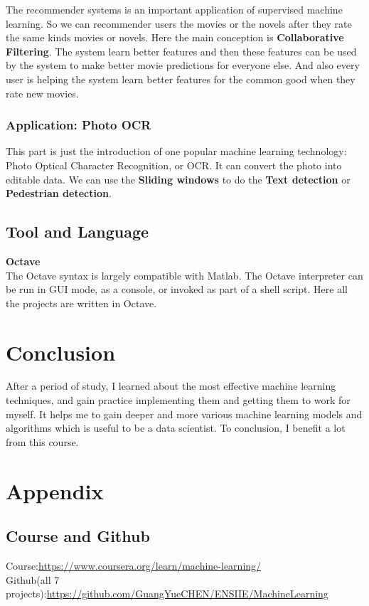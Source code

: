 \documentclass[a4paper]{article}
\begin{document}
{The recommender systems is an important application of supervised machine learning. So we can recommender users the movies or the novels after they rate the same kinds movies or novels. Here the main conception is \textbf{Collaborative Filtering}. The system learn better features and then these features can be used by the system to make better movie predictions for everyone else. And also every user is helping the system learn better features for the common good when they rate new movies. 
\subsubsection{\textbf{Application: Photo OCR}}
This part is just the introduction of one popular machine learning technology: Photo Optical Character Recognition, or OCR.  It can convert the photo into editable data. We can use the \textbf{Sliding windows} to do the \textbf{Text detection} or \textbf{Pedestrian  detection}.

\subsection{Tool and Language}
\textbf{Octave}\\
The Octave syntax is largely compatible with Matlab. The Octave interpreter can be run in GUI mode, as a console, or invoked as part of a shell script. Here all the projects are written in Octave.

\newpage
\section{Conclusion}
After a period of study, I learned about the most effective machine learning techniques, and gain practice implementing them and getting them to work for myself. It helps me to gain deeper and more various machine learning models and algorithms which is useful to be a data scientist. To conclusion, I benefit a lot from this course.
}
\section{Appendix}
\subsection{Course and Github}

Course:\href{https://www.coursera.org/learn/machine-learning/}{https://www.coursera.org/learn/machine-learning/} \\
Github(all 7 projects):\href{https://github.com/GuangYueCHEN/ENSIIE/tree/master/Plus/MachineLearning}{https://github.com/GuangYueCHEN/ENSIIE/MachineLearning} 
\end{document}
